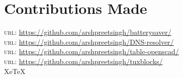 \documentclass[10pt, a4paper]{article}
\begin{document}
\section*{Contributions Made}
\textsc{url}: \href{https://github.com/arshpreetsingh/batterysaver/}{https://github.com/arshpreetsingh/batterysaver/}\\
\textsc{url}: \href{https://github.com/arshpreetsingh/DNS-resolver/}{https://github.com/arshpreetsingh/DNS-resolver/}\\
\textsc{url}: \href{https://github.com/arshpreetsingh/table-openscad/}{https://github.com/arshpreetsingh/table-openscad/}\\
\textsc{url}: \href{https://github.com/arshpreetsingh/tuxblocks/}{https://github.com/arshpreetsingh/tuxblocks/}\\


{XeTeX }\\
\end{document}
